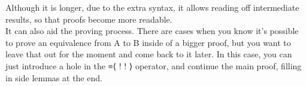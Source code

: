   Although it is longer, due to the extra syntax, it allows reading off intermediate results, so that
  proofs become more readable. \\
  It can also aid the proving process. There are cases when you know it's
  possible to prove an equivalence from A to B inside of a bigger proof, but you want to leave that out
  for the moment and come back to it later.
  In this case, you can just introduce a hole in the ≡⟨ {!   !} ⟩ operator, and continue the main proof,
  filling in side lemmas at the end.
